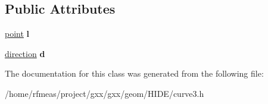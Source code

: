 \subsection*{Public Attributes}
\begin{DoxyCompactItemize}
\item 
\hyperlink{classgxx_1_1geom3_1_1point}{point} {\bfseries l}\hypertarget{classgxx_1_1curve3_1_1line_a236a0590fd899a7636932e3a52c70c47}{}\label{classgxx_1_1curve3_1_1line_a236a0590fd899a7636932e3a52c70c47}

\item 
\hyperlink{classgxx_1_1geom3_1_1direction}{direction} {\bfseries d}\hypertarget{classgxx_1_1curve3_1_1line_ad239017232d092f33132afe15a80fc97}{}\label{classgxx_1_1curve3_1_1line_ad239017232d092f33132afe15a80fc97}

\end{DoxyCompactItemize}


The documentation for this class was generated from the following file\+:\begin{DoxyCompactItemize}
\item 
/home/rfmeas/project/gxx/gxx/geom/\+H\+I\+D\+E/curve3.\+h\end{DoxyCompactItemize}

